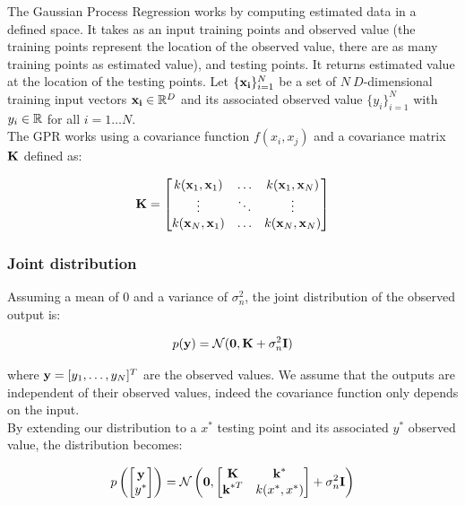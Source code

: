 The Gaussian Process Regression works by computing estimated data in a defined space. It takes as an input training points and observed value (the training points represent the location of the observed value, there are as many training points as estimated value), and testing points. It returns estimated value at the location of the testing points. Let
$\{\boldsymbol{\mathbf{x_i}}\}_{i=1}^N$ be a set of $N\ D$-dimensional training input vectors $\boldsymbol{\mathbf{x_i}} \in \mathbb{R}^D$ and its associated observed value $\{y_i\}_{i=1}^N$ with $y_i \in \mathbb{R}$ for all $i=1\hdots N$.\\
The GPR works using a covariance function
$f(x_i, x_j)$ and a covariance matrix $\boldsymbol{\mathbf{{K}}}$ defined as:

\begin{equation}
  \label{equ_covariancetrainingdata}
  \boldsymbol{\mathbf{{K}}} =
  \begin{bmatrix}
    k(\boldsymbol{\mathbf{x}}_1, \boldsymbol{\mathbf{x}}_1) & \hdots & k(\boldsymbol{\mathbf{x}}_1, \boldsymbol{\mathbf{x}}_N) \\
    \vdots & \ddots & \vdots \\
    k(\boldsymbol{\mathbf{x}}_N, \boldsymbol{\mathbf{x}}_1) & \hdots & k(\boldsymbol{\mathbf{x}}_N, \boldsymbol{\mathbf{x}}_N) \\
  \end{bmatrix}
\end{equation}

\subsubsection{Joint distribution}

Assuming a mean of 0 and a variance of $\sigma_n^2$, the joint distribution of the observed output is:

\begin{equation}
  \label{equ_probdist}
  p(\boldsymbol{\mathbf{y}}) = \mathcal{N}(\boldsymbol{\mathbf{0}}, \boldsymbol{\mathbf{{K}}} + \sigma_n^2 \boldsymbol{\mathbf{{I}}})
\end{equation}

where $\boldsymbol{\mathbf{y}} = [y_1,\hdots, y_N]^T$ are the observed values. We assume that the outputs are independent of their observed values, indeed the covariance function only depends on the input.\\

By extending our distribution to a $x^*$ testing point and its associated $y^*$ observed value, the distribution becomes:

\begin{equation}
  \label{equ_probdist2}
  p\left(
    \begin{bmatrix}
      \boldsymbol{\mathbf{y}} \\ y^*
    \end{bmatrix}
\right) = \mathcal{N}\left(\boldsymbol{\mathbf{0}},
\begin{bmatrix}
  \boldsymbol{\mathbf{{K}}} & \boldsymbol{\mathbf{k}}^* \\ \boldsymbol{\mathbf{k}}^{*T} & k(x^*, x^*)
\end{bmatrix}
+ \sigma_n^2 \boldsymbol{\mathbf{{I}}}\right)
\end{equation}

